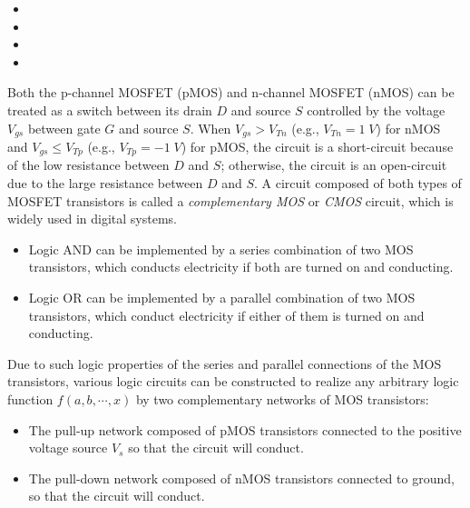 \documentclass{article}
\begin{document}
\begin{itemize}
\item {}
\item {}
\item {}
\item {}
\end{itemize}



Both the p-channel MOSFET (pMOS) and n-channel MOSFET (nMOS) can be
treated as a switch between its drain $D$ and source $S$ controlled by
the voltage $V_{gs}$ between gate $G$ and source $S$. When $V_{gs}>V_{Tn}$ 
(e.g.,  $V_{Tn}=1\;V$) for nMOS and $V_{gs}\le V_{Tp}$ (e.g.,  $V_{Tp}=-1\;V$)
for pMOS, the circuit is a short-circuit because of the low resistance between 
$D$ and $S$; otherwise, the circuit is an open-circuit due to the large 
resistance between $D$ and $S$. A circuit composed of both types of MOSFET 
transistors is called a {\em complementary MOS} or {\em CMOS} circuit, which
is widely used in digital systems.

\begin{itemize}
\item Logic AND can be implemented by a series combination of two MOS
  transistors, which conducts electricity if both are turned on and
  conducting.

\item Logic OR can be implemented by a parallel combination of two MOS
  transistors, which conduct electricity if either of them is turned on
  and conducting.
\end{itemize}

Due to such logic properties of the series and parallel connections of the
MOS transistors, various logic circuits can be constructed to realize any
arbitrary logic function $f(a,b,\cdots,x)$ by two complementary networks
of MOS transistors:
\begin{itemize}
\item The pull-up network composed of pMOS transistors connected to the
  positive voltage source $V_s$ so that the circuit will conduct.
  
\item The pull-down network composed of nMOS transistors connected to
  ground, so that the circuit will conduct. 
\end{itemize}
\end{document}
